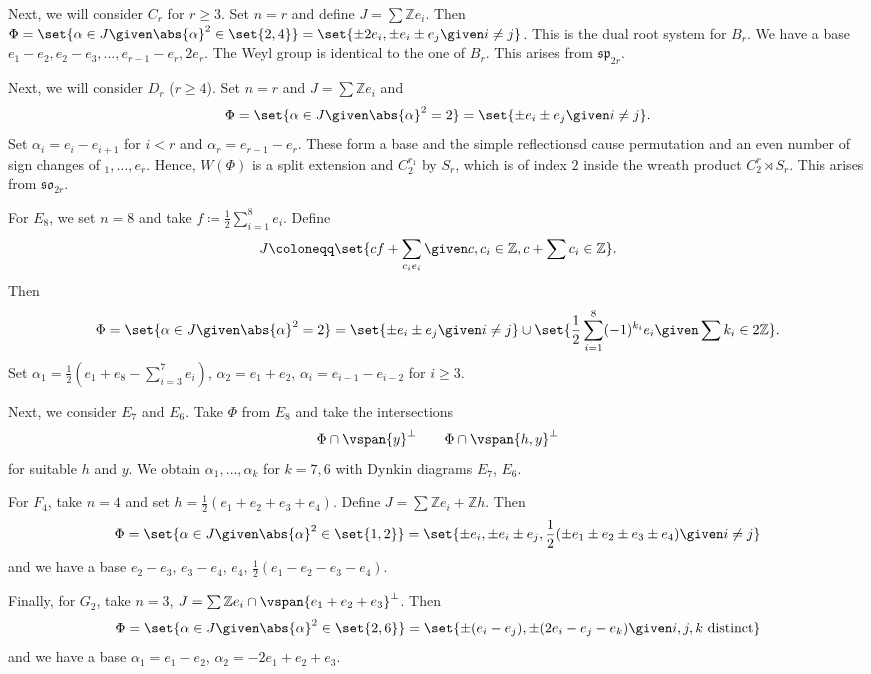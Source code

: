 Next, we will consider $C_r$ for $r\geq 3$. Set $n = r$ and define
$J = \sum \mathbb{Z}e_i$. Then
$\Phi = \set{\alpha \in J\given \abs{\alpha}^2 \in \set{2, 4}} = \set{\pm 2e_i, \pm e_i\pm e_j\given i\neq j}$.
This is the dual root system for $B_r$. We have a base $e_1 - e_2, e_2 - e_3, \ldots, e_{r-1} - e_r, 2e_r$.
The Weyl group is identical to the one of $B_r$. This arises from $\mathfrak{sp}_{2r}$.

Next, we will consider $D_r$ ($r\geq 4$). Set $n = r$ and $J = \sum \mathbb{Z}e_i$
and
\[ \Phi = \set{\alpha \in J\given \abs{\alpha}^2 = 2} = \set{\pm e_i\pm e_j\given i\neq j}. \]
Set $\alpha_i = e_i - e_{i+1}$ for $i < r $ and $\alpha_r = e_{r-1} - e_r$. These
form a base and the simple reflectionsd cause permutation and an even number of
sign changes of $_1, \ldots, e_r$. Hence, $W(\Phi)$ is a split extension and
$C_2^{r_1}$ by $S_r$, which is of index $2$ inside the wreath product
$C_2^r\rtimes S_r$. This arises from $\mathfrak{so}_{2r}$.

For $E_8$, we set $n = 8$ and take $f\coloneqq \frac{1}{2}\sum_{i=1}^8 e_i$.
Define
\[ J\coloneqq \set{cf + \sum_{c_ie_i}\given c, c_i \in\mathbb{Z}, c + \sum c_i \in\mathbb{Z}}. \]
Then
\[ \Phi = \set{\alpha \in J\given \abs{\alpha}^2 = 2} = \set{\pm e_i\pm e_j\given i\neq j}\cup\set{\frac{1}{2}\sum_{i=1}^8(-1)^{k_i}e_i\given \sum k_i \in 2\mathbb{Z}}. \]
Set $\alpha_1 = \frac{1}{2}(e_1 + e_8 - \sum_{i=3}^7 e_i)$,
$\alpha_2 = e_1 + e_2$, $\alpha_i = e_{i-1}- e_{i-2}$ for $i\geq 3$.

Next, we consider $E_7$ and $E_6$. Take $\Phi$ from $E_8$ and take the intersections
\[ \Phi\cap \vspan{y}^\perp\qquad \Phi\cap \vspan{h, y}^\perp \]
for suitable $h$ and $y$. We obtain $\alpha_1, \ldots, \alpha_k$ for $k = 7,6$
with Dynkin diagrams $E_7$, $E_6$.

For $F_4$, take $n = 4$ and set $h = \frac{1}{2}(e_1+e_2+e_3+e_4)$. Define
$J = \sum \mathbb{Z}e_i + \mathbb{Z}h$. Then
\[ \Phi = \set{\alpha \in J\given \abs{\alpha}^2 \in \set{1, 2}} = \set{\pm e_i, \pm e_i\pm e_j, \frac{1}{2}(\pm e_1\pm e_2\pm e_3\pm e_4) \given i\neq j} \]
and we have a base $e_2-e_3$, $e_3 - e_4$, $e_4$, $\frac{1}{2}(e_1-e_2-e_3-e_4)$.

Finally, for $G_2$, take $n = 3$, $J = \sum \mathbb{Z}e_i \cap \vspan{e_1 + e_2 + e_3}^\perp$.
Then
\[ \Phi = \set{\alpha \in J\given \abs{\alpha}^2 \in \set{2, 6}} = \set{\pm(e_i-e_j), \pm(2e_i-e_j-e_k)\given i, j, k\text{ distinct}} \]
and we have a base $\alpha_1 = e_1 - e_2$, $\alpha_2 = -2e_1 + e_2 + e_3$.
